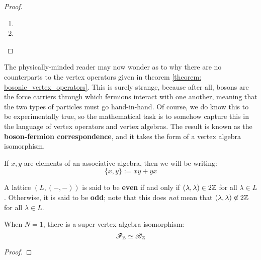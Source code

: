                 \begin{proof}
                    \begin{enumerate}
                        \item 
                        \item 
                    \end{enumerate}
                \end{proof}

            The physically-minded reader may now wonder as to why there are no  counterparts to the vertex operators given in theorem \ref{theorem: bosonic_vertex_operators}. This is surely strange, because after all, bosons are the force carriers through which fermions interact with one another, meaning that the two types of particles must go hand-in-hand. Of course, we do know this to be experimentally true, so the mathematical task is to somehow capture this in the language of vertex operators and vertex algebras. The result is known as the \textbf{boson-fermion correspondence}, and it takes the form of a vertex algebra isomorphism.

            \begin{convention}
                If $x, y$ are elements of an associative algebra, then we will be writing:
                    $$\{x, y\} := xy + yx$$
            \end{convention}


            \begin{definition} \label{def: even_and_odd_lattices}
                A lattice $(L, (-, -))$ is said to be \textbf{even} if and only if $(\lambda, \lambda) \in 2\mathbb{Z}$ for all $\lambda \in L$. Otherwise, it is said to be \textbf{odd}; note that this does \textit{not} mean that $(\lambda, \lambda) \not \in 2\mathbb{Z}$ for all $\lambda \in L$.
            \end{definition}
            \begin{definition} \label{def: lattice_clifford_(super)_algebras}
                 
            \end{definition}
            
            \begin{theorem}  \label{theorem: boson_fermion_correspondence}
                When $N = 1$, there is a super vertex algebra isomorphism:
                    $$\mathscr{F}_{\mathbb{Z}} \simeq \mathscr{B}_{\mathbb{Z}}$$
            \end{theorem}
                \begin{proof}
                    
                \end{proof}
                
